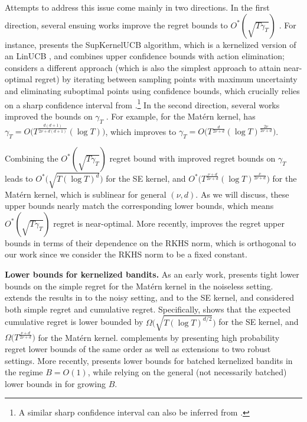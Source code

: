 \documentclass[10pt]{article}
\begin{document}
Attempts to address this issue come mainly in two directions. In the first direction, several ensuing works improve the regret bounds to $O^*(\sqrt{T\gamma_T})$ \citep{Valko13, Janz20, Salgia21, Camilleri21, Li22, Vakili22, Salgia24}. For instance, \citep{Valko13} presents the SupKernelUCB algorithm, which is a kernelized version of an LinUCB \citep{Chu11}, and combines upper confidence bounds with action elimination; \citep{Li22} considers a different approach (which is also the simplest approach to attain near-optimal regret) by iterating between sampling points with maximum uncertainty and eliminating suboptimal points using confidence bounds, which crucially relies on a sharp confidence interval from \citep{Vakili21a}.\footnote{A similar sharp confidence interval can also be inferred from \citep{Valko13}.} In the second direction, several works improved the bounds on $\gamma_T$ \citep{Janz20, Vakili21b}. For example, for the Mat\'ern kernel, \citep{Srinivas10} has $\gamma_T = O \bigl( T^{\frac{d(d+1)}{2\nu + d(d+1)}} (\log T) \bigr)$, which \citep{Vakili21b} improves to $\gamma_T = O \bigl( T^{\frac{d}{2\nu+d}} (\log T)^{\frac{2\nu}{2\nu+d}} \bigr)$.

Combining the $O^*(\sqrt{T\gamma_T})$ regret bound with improved regret bounds on $\gamma_T$ leads to $O^*\bigl(\sqrt{T(\log T)^d}\bigr)$ for the SE kernel, and $O^*\bigl(T^{\frac{\nu+d}{2\nu+d}}(\log T)^{\frac{\nu}{2\nu+d}}\bigr)$ for the Mat\'ern kernel, which is sublinear for general $(\nu,d)$. 
As we will discuss, these upper bounds nearly match the corresponding lower bounds, which means $O^*(\sqrt{T\gamma_T})$ regret is near-optimal.
More recently, \citep{Iwazaki2025} improves the regret upper bounds in terms of their dependence on the RKHS norm, which is orthogonal to our work since we consider the RKHS norm to be a fixed constant.


\textbf{Lower bounds for kernelized bandits.} As an early work, \citep{Bull11} presents tight lower bounds on the simple regret for the Mat\'ern kernel in the noiseless setting. \citep{Scarlett17} extends the results in \citep{Bull11} to the noisy setting, and to the SE kernel, and considered both simple regret and cumulative regret. Specifically, \citep{Scarlett17} shows that the expected cumulative regret is lower bounded by $\Omega\bigl(\sqrt{T(\log T)^{d/2}}\bigr)$ for the SE kernel, and $\Omega\bigl(T^{\frac{\nu+d}{2\nu+d}}\bigr)$ for the Mat\'ern kernel. \citep{Cai21} complements \citep{Scarlett17} by presenting high probability regret lower bounds of the same order as well as extensions to two robust settings. More recently, \citep{Li22} presents lower bounds for batched kernelized bandits in the regime $B = O(1)$, while relying on the general (not necessarily batched) lower bounds in \citep{Scarlett17} for growing $B$.
\end{document}
